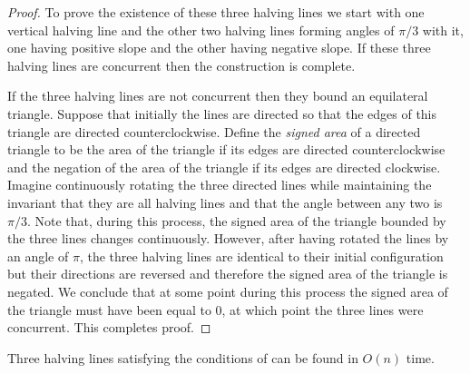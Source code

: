 \documentclass[lotsofwhite]{patmorin}
\begin{document}
\begin{proof}
To prove the existence of these three halving lines we start with one
vertical halving line and the other two halving lines forming angles
of $\pi/3$ with it, one having positive slope and the other
having negative slope.  If these three halving lines are concurrent
then the construction is complete. 

If the three halving lines are not concurrent then they bound an
equilateral triangle.  Suppose that initially the lines are directed
so that the edges of this triangle are directed counterclockwise.
Define the \emph{signed area} of a directed triangle to be the area of
the triangle if its edges are directed counterclockwise and the
negation of the area of the triangle if its edges are directed
clockwise.  Imagine continuously rotating the three directed lines while
maintaining the invariant that they are all halving lines and that the
angle between any two is $\pi/3$.  Note that, during this process, the
signed area of the triangle bounded by the three lines changes
continuously.  However, after having rotated the lines by an angle of
$\pi$, the three halving lines are identical to their initial
configuration but their directions are reversed and therefore the
signed area of the triangle is negated.  We conclude that at some
point during this process the signed area of the triangle must have
been equal to 0, at which point the three lines were concurrent.  This
completes proof.
\end{proof}

\begin{lem}
Three halving lines satisfying the conditions of 
can be found in $O(n)$ time.
\end{lem}
\end{document}
